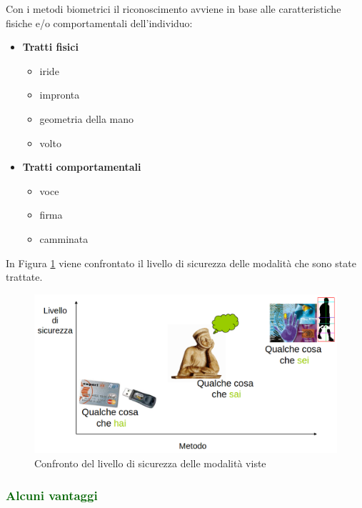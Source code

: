 \documentclass{report}
\begin{document}
Con i metodi biometrici il riconoscimento avviene in base alle caratteristiche fisiche e/o comportamentali dell’individuo:
\begin{itemize}
    \item \textbf{Tratti fisici}

    \begin{itemize}
        \item iride
        \item impronta
        \item geometria della mano
        \item volto
    \end{itemize}
    \item \textbf{Tratti comportamentali}

    \begin{itemize}
        \item voce
        \item firma
        \item camminata
    \end{itemize}
\end{itemize}

\noindent In Figura \ref{fig:trad-vs-bio} viene confrontato il livello di sicurezza delle modalità che sono state trattate.

\begin{figure}
    \centering
    \includegraphics[width=0.75\linewidth]{images/tradizionali_vs_biometrici.png}
    \caption{Confronto del livello di sicurezza delle modalità viste}
    \label{fig:trad-vs-bio}
\end{figure}

\subsubsection{\textcolor{darkgreen}{Alcuni vantaggi}}
\end{document}
